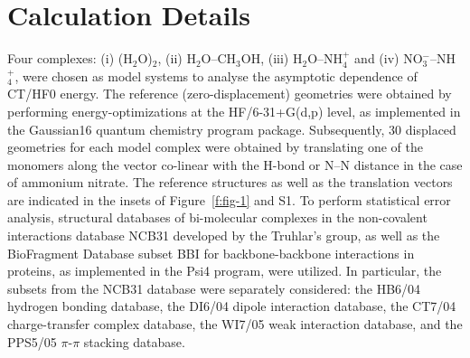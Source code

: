 \documentclass[aip,jcp,amsmath,amssymb,reprint,floatfix]{revtex4-1}
\begin{document}
\section{\label{s:4.calculations}Calculation Details}

Four complexes: 
(i) (H$_2$O)$_2$, 
(ii) H$_2$O--CH$_3$OH, 
(iii) H$_2$O--NH$_4^+$ and 
(iv) NO$_3^-$--NH$_4^+$,
were chosen as model systems to analyse the asymptotic dependence 
of CT/HF0 energy. 
The reference (zero\hyp{}displacement) geometries
were obtained by
performing energy\hyp{}optimizations at the HF/6-31+G(d,p) level,
as implemented in 
the {\sc Gaussian16} quantum chemistry program package.\cite{Gaussian16}
Subsequently, 30 displaced geometries for each model complex
were obtained by translating one of the monomers along the vector 
co\hyp{}linear with the H-bond or N--N distance in the case of ammonium nitrate.
The reference structures as well as the translation vectors are
indicated in the insets of Figure~\ref{f:fig-1} and S1.
To perform statistical error analysis, structural databases
of bi\hyp{}molecular complexes in the non\hyp{}covalent
interactions database NCB31 developed by the Truhlar's 
group,\cite{Zhao.Schultz.Truhlar.JCTC.2006,
Zhao.Truhlar.JCTC.2005,Zhao.Schultz.Truhlar.JCTC.2006,Zhao.Schultz.Truhlar.JCP.2005}
as well as the BioFragment Database subset BBI for backbone\hyp{}backbone
interactions in proteins,\cite{Burns.Faver.Zheng.Marshall.Smith.Vanommeslaeghe.MacKerell.Merz.Sherrill.JCP.2017} 
as implemented in the {\sc Psi4}
program,\cite{Psi4.JCTC.2017}
were utilized.
In particular, the subsets from the NCB31 database were separately considered:
the HB6/04 hydrogen bonding database,\cite{Zhao.Truhlar.JCTC.2005,Zhao.Schultz.Truhlar.JCTC.2006,Zhao.Schultz.Truhlar.JCP.2005}
the DI6/04 dipole interaction database,\cite{Zhao.Truhlar.JCTC.2005,Zhao.Schultz.Truhlar.JCTC.2006,Zhao.Schultz.Truhlar.JCP.2005}
the CT7/04 charge-transfer complex database,\cite{Zhao.Truhlar.JCTC.2005,Zhao.Schultz.Truhlar.JCTC.2006,Zhao.Schultz.Truhlar.JCP.2005}
the WI7/05 weak interaction database,\cite{Zhao.Schultz.Truhlar.JCTC.2006,Zhao.Schultz.Truhlar.JCP.2005,Zhao.Truhlar.JPCA.2005}
and 
the PPS5/05 $\pi$-$\pi$ stacking database.\cite{Zhao.Schultz.Truhlar.JCTC.2006,Zhao.Schultz.Truhlar.JCP.2005,Zhao.Truhlar.JPCA.2005}
\end{document}

